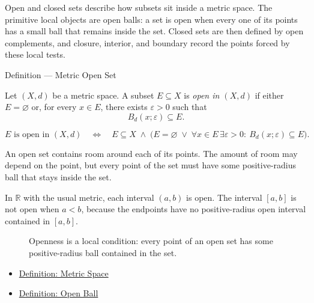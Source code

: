 \begin{remark*}[Exposition]
Open and closed sets describe how subsets sit inside a metric space.  The
primitive local objects are open balls: a set is open when every one of its
points has a small ball that remains inside the set.  Closed sets are then
defined by open complements, and closure, interior, and boundary record the
points forced by these local tests.
\end{remark*}

\begin{definitionbox}{Definition --- Metric Open Set}
\begin{definition}\label{def:metric-open-set}
Let \((X,d)\) be a metric space.  A subset \(E\subseteq X\) is \emph{open in
\((X,d)\)} if either \(E=\varnothing\) or, for every \(x\in E\), there exists
\(\varepsilon>0\) such that
\[
  B_d(x;\varepsilon)\subseteq E.
\]
\end{definition}
\end{definitionbox}

\begin{remark*}
\[
E\text{ is open in }(X,d)
\quad\Longleftrightarrow\quad
E\subseteq X
\;\land\;
\bigl(E=\varnothing
\;\lor\;
\forall x\in E\,\exists\varepsilon>0{:}\ B_d(x;\varepsilon)\subseteq E\bigr).
\]
\end{remark*}

\begin{remark*}[Interpretation]
An open set contains room around each of its points.  The amount of room may
depend on the point, but every point of the set must have some positive-radius
ball that stays inside the set.
\end{remark*}

\begin{remark*}[Examples]
In \(\mathbb{R}\) with the usual metric, each interval \((a,b)\) is open.
The interval \([a,b]\) is not open when \(a<b\), because the endpoints have no
positive-radius open interval contained in \([a,b]\).
\end{remark*}

\begin{figure}[htbp]
\centering

\caption{Openness is a local condition: every point of an open set has some
positive-radius ball contained in the set.}
\label{fig:open-set-local-room}
\end{figure}

\begin{dependencies}
\begin{itemize}
  \item \hyperref[def:metric-space]{Definition: Metric Space}
  \item \hyperref[def:metric-open-ball]{Definition: Open Ball}
\end{itemize}
\end{dependencies}


